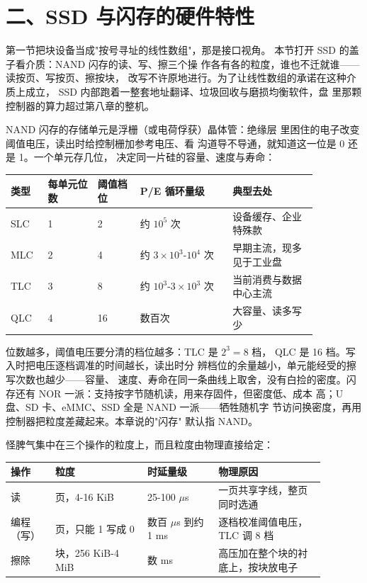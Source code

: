 \section{二、SSD 与闪存的硬件特性}

第一节把块设备当成"按号寻址的线性数组"，那是接口视角。
本节打开 SSD 的盖子看介质：NAND 闪存的读、写、擦三个操
作各有各的粒度，谁也不迁就谁——读按页、写按页、擦按块，
改写不许原地进行。为了让线性数组的承诺在这种介质上成立，
SSD 内部跑着一整套地址翻译、垃圾回收与磨损均衡软件，盘
里那颗控制器的算力超过第八章的整机。

NAND 闪存的存储单元是浮栅（或电荷俘获）晶体管：绝缘层
里困住的电子改变阈值电压，读出时给控制栅加参考电压、看
沟道导不导通，就知道这一位是 0 还是 1。一个单元存几位，
决定同一片硅的容量、速度与寿命：

\begin{longtable}{L{0.1\linewidth}L{0.14\linewidth}L{0.12\linewidth}L{0.26\linewidth}L{0.24\linewidth}}
\toprule
类型 & 每单元位数 & 阈值档位 & P/E 循环量级 & 典型去处 \\
\midrule
SLC & 1 & 2 & 约 $10^{5}$ 次 & 设备缓存、企业特殊款 \\
MLC & 2 & 4 & 约 $3\times10^{3}$-$10^{4}$ 次 & 早期主流，现多见于工业盘 \\
TLC & 3 & 8 & 约 $10^{3}$-$3\times10^{3}$ 次 & 当前消费与数据中心主流 \\
QLC & 4 & 16 & 数百次 & 大容量、读多写少 \\
\bottomrule
\end{longtable}

位数越多，阈值电压要分清的档位越多：TLC 是 $2^{3}=8$ 档，
QLC 是 16 档。写入时把电压逐档调准的时间越长，读出时分
辨档位的余量越小，单元能经受的擦写次数也越少——容量、
速度、寿命在同一条曲线上取舍，没有白捡的密度。闪存还有
NOR 一派：支持按字节随机读，用来存固件，但密度低、成本
高；U 盘、SD 卡、eMMC、SSD 全是 NAND 一派——牺牲随机字
节访问换密度，再用控制器把粒度差藏起来。本章说的"闪存"
默认指 NAND。

怪脾气集中在三个操作的粒度上，而且粒度由物理直接给定：

\begin{longtable}{L{0.12\linewidth}L{0.26\linewidth}L{0.2\linewidth}L{0.3\linewidth}}
\toprule
操作 & 粒度 & 时延量级 & 物理原因 \\
\midrule
读 & 页，4-16 KiB & 25-100 $\mu$s & 一页共享字线，整页同时选通 \\
编程（写） & 页，只能 1 写成 0 & 数百 $\mu$s 到约 1 ms & 逐档校准阈值电压，TLC 调 8 档 \\
擦除 & 块，256 KiB-4 MiB & 数 ms & 高压加在整个块的衬底上，按块放电子 \\
\bottomrule
\end{longtable}

